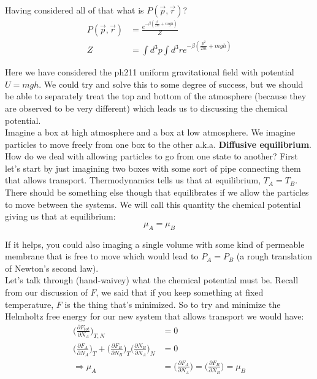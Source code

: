 \documentclass[a4paper, 11pt]{article}
\begin{document}
	\noindent Having considered all of that what is $P(\vec{p},\vec{r})$? 
		\begin{align*}
			P(\vec{p}, \vec{r})&= \frac{e^{-\beta (\frac{p^2}{2m}+mgh)}}{Z}\\
			Z &= \int d^3p \int d^3 r e^{-\beta (\frac{p^2}{2m}+mgh)}
		\end{align*}
	
	\noindent Here we have considered the ph211 uniform gravitational field with potential $U = mgh$. We could try and solve this to some degree of success, but we should be able to separately treat the top and bottom of the atmosphere (because they are observed to be very different) which leads us to discussing the chemical potential. \\ 
	
	\noindent Imagine a box at high atmosphere and a box at low atmosphere. We imagine particles to move freely from one box to the other a.k.a. \textbf{Diffusive equilibrium}. How do we deal with allowing particles to go from one state to another? First let's start by just imagining two boxes with some sort of pipe connecting them that allows transport. Thermodynamics tells us that at equilibrium, $T_A = T_B$. There should be something else though that equilibrates if we allow the particles to move between the systems. We will call this quantity the chemical potential giving us that at equilibrium:	
		\begin{equation*}
			\mu_A = \mu_B 
		\end{equation*}
		
	\noindent If it helps, you could also imaging a single volume with some kind of permeable membrane that is free to move which would lead to $P_A = P_B$ (a rough translation of Newton's second law). \\
	
	\noindent Let's talk through (hand-waivey) what the chemical potential must be. Recall from our discussion of $F$, we said that if you keep something at fixed temperature, $F$ is the thing that's minimized. So to try and minimize the Helmholtz free energy for our new system that allows transport we would have:	
		\begin{align*}
			\Big(\frac{\partial F_{tot}}{\partial N_A}\Big)_{T,N} &= 0\\
			\Big(\frac{\partial F_A}{\partial N_A}\Big)_T + \Big(\frac{\partial F_B}{\partial N_B}\Big)_T\Big(\frac{\partial N_B}{\partial N_A}\Big)_N &= 0 \\
			\Rightarrow \mu_A &= \Big(\frac{\partial F_A}{\partial N_A}\Big) = \Big(\frac{\partial F_B}{\partial N_B}\Big) = \mu_B 
		\end{align*}
	
\end{document}
